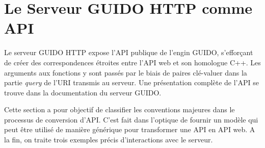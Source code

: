 \documentclass{article}
\begin{document}

\section{Le Serveur GUIDO HTTP comme API}\label{section:guido-api}
Le serveur GUIDO HTTP expose l'API publique de l'engin GUIDO, s'efforçant de créer des correspondences étroites entre l'API web et son homologue C++. Les arguments aux fonctions y sont passés par le biais de paires clé-valuer dans la partie \emph{query} de l'URI transmis au serveur. Une présentation complète de l'API se trouve dans la documentation du serveur GUIDO\cite{guidoserverdoc}.\par
Cette section a pour objectif de classifier les conventions majeures dans le processus de conversion d'API. C'est fait dans l'optique de fournir un modèle qui peut être utilisé de manière générique pour transformer une API en API web. A la fin, on traite trois exemples précis d'interactions avec le serveur. 
\end{document}
